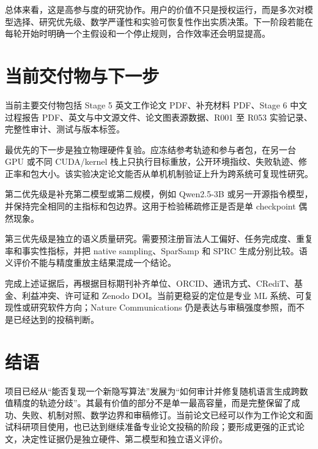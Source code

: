 \documentclass[12pt,a4paper]{article}
\begin{document}
总体来看，这是高参与度的研究协作。用户的价值不只是授权运行，而是多次对模型选择、研究优先级、数学严谨性和实验可恢复性作出实质决策。下一阶段若能在每轮开始时明确一个主假设和一个停止规则，合作效率还会明显提高。

\section{当前交付物与下一步}

当前主要交付物包括 Stage 5 英文工作论文 PDF、补充材料 PDF、Stage 6 中文过程报告 PDF、英文与中文源文件、论文图表源数据、R001 至 R053 实验记录、完整性审计、测试与版本标签。

最优先的下一步是独立物理硬件复验。应冻结参考轨迹和参与者包，在另一台 GPU 或不同 CUDA/kernel 栈上只执行目标重放，公开环境指纹、失败轨迹、修正率和包大小。该实验决定论文能否从单机机制验证上升为跨系统可复现性研究。

第二优先级是补充第二模型或第二规模，例如 Qwen2.5-3B 或另一开源指令模型，并保持完全相同的主指标和包边界。这用于检验稀疏修正是否是单 checkpoint 偶然现象。

第三优先级是独立的语义质量研究。需要预注册盲法人工偏好、任务完成度、重复率和事实性指标，并把 native sampling、SparSamp 和 SPRC 生成分别比较。语义评价不能与精度重放主结果混成一个结论。

完成上述证据后，再根据目标期刊补齐单位、ORCID、通讯方式、CRediT、基金、利益冲突、许可证和 Zenodo DOI。当前更稳妥的定位是专业 ML 系统、可复现性或研究软件方向；Nature Communications 仍是表达与审稿强度参照，而不是已经达到的投稿判断。

\section*{结语}

项目已经从“能否复现一个新隐写算法”发展为“如何审计并修复随机语言生成跨数值精度的轨迹分歧”。其最有价值的部分不是单一最高容量，而是完整保留了成功、失败、机制对照、数学边界和审稿修订。当前论文已经可以作为工作论文和面试科研项目使用，也已达到继续准备专业论文投稿的阶段；要形成更强的正式论文，决定性证据仍是独立硬件、第二模型和独立语义评价。
\end{document}

